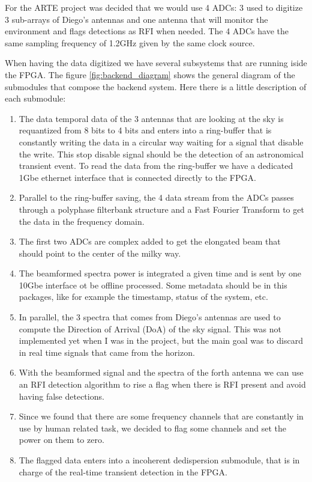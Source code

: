 For the ARTE project was decided that we would use 4 ADCs: 3 used to digitize 3 sub-arrays of Diego's antennas and one antenna that will monitor the environment and flags detections as RFI when needed. The 4 ADCs have the same sampling frequency of 1.2GHz given by the same clock source.

When having the data digitized we have several subsystems that are running iside the FPGA. The figure \ref{fig:backend_diagram} shows the general diagram of the submodules that compose the backend system.
Here there is a little description of each submodule:
\begin{enumerate}
    \item The data temporal data of the 3 antennas that are looking at the sky is requantized from 8 bits to 4 bits and enters into a ring-buffer that is constantly writing the data in a circular way waiting for a signal that disable the write. This stop disable signal should be the detection of an astronomical transient event. To read the data from the ring-buffer we have a dedicated 1Gbe ethernet interface that is connected directly to the FPGA.
    \item Parallel to the ring-buffer saving, the 4 data stream from the ADCs passes through a polyphase filterbank structure and a Fast Fourier Transform to get the data in the frequency domain.
    \item The first two ADCs are complex added to get the elongated beam that should point to the center of the milky way.
    \item The beamformed spectra power is integrated a given time and is sent by one 10Gbe interface ot be offline processed. Some metadata should be in this packages, like for example the timestamp, status of the system, etc.
    \item In parallel, the 3 spectra that comes from Diego's antennas are used to compute the Direction of Arrival (DoA) of the sky signal. This was not implemented yet when I was in the project, but the main goal was to discard in real time signals that came from the horizon.
    \item With the beamformed signal and the spectra of the forth antenna we can use an RFI detection algorithm to rise a flag when there is RFI present and avoid having false detections.
    \item Since we found that there are some frequency channels that are constantly in use by human related task, we decided to flag some channels and set the power on them to zero.
    \item The flagged data enters into a incoherent dedispersion submodule, that is in charge of the real-time transient detection in the FPGA.
\end{enumerate}

